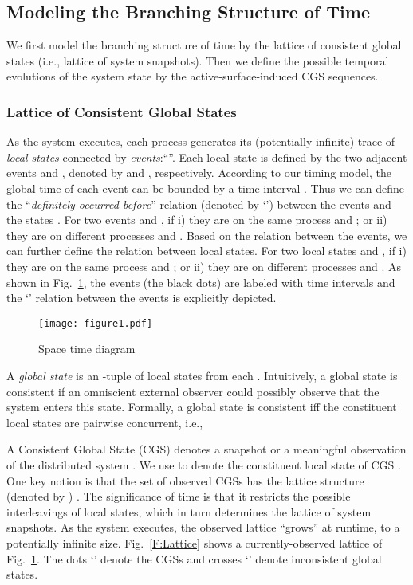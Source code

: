 \documentclass[10pt,conference,compsocconf,letterpaper]{IEEEtran}
\begin{document}
\subsection{Modeling the Branching Structure of Time}

We first model the branching structure of time by the lattice of consistent global states (i.e., lattice of system snapshots). Then we define the possible temporal evolutions of the system state by the active-surface-induced CGS sequences.

\subsubsection{Lattice of Consistent Global States}

As the system executes, each process  generates its (potentially infinite) trace of \textit{local states} connected by \textit{events}:``''. Each local state  is defined by the two adjacent events  and , denoted by  and , respectively. According to our timing model, the global time of each event can be bounded by a time interval . Thus we can define the ``\textit{definitely occurred before}'' relation (denoted by `') between the events and the states \cite{Stoller00}. For two events  and ,  if i) they are on the same process and ; or ii) they are on different processes and . Based on the relation between the events, we can further define the relation between local states. For two local states  and ,  if i) they are on the same process and ; or ii) they are on different processes and . As shown in Fig.~\ref{F:space-time diagram}, the events (the black dots) are labeled with time intervals and the `' relation between the events is explicitly depicted.

\begin{figure}[tbp]
\begin{center}
  \texttt{[image: figure1.pdf]}
  \caption{Space time diagram}
  \label{F:space-time diagram}
\end{center}
\end{figure}

A \textit{global state}  is an -tuple of local states from each .
Intuitively, a global state is consistent if an omniscient external observer could possibly observe that the system enters this state. Formally, a global state  is consistent iff the constituent local states are pairwise concurrent, i.e.,

A Consistent Global State (CGS) denotes a snapshot or a meaningful observation of the distributed system \cite{Babaoglu93, Schwarz94}. We use  to denote the  constituent local state of CGS .
One key notion is that the set of observed CGSs has the lattice structure (denoted by ) \cite{Stoller00}. The significance of time is that it restricts the possible interleavings of local states, which in turn determines the lattice of system snapshots. As the system executes, the observed lattice ``grows'' at runtime, to a potentially infinite size. Fig.~\ref{F:Lattice} shows a currently-observed lattice of Fig.~\ref{F:space-time diagram}. The dots `' denote the CGSs and crosses `' denote inconsistent global states.
\end{document}
